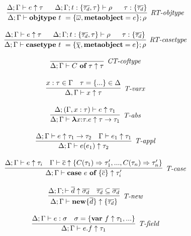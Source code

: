 \begin{figure}
\centering
\[
\begin{array}{c}

\infer[\textit{RT-objtype}]
	{\Delta; \Gamma \vdash  \keyw{objtype}~ t~=\{\overline{\omega}, \keyw{metaobject}=e\}; \rho} 
	{\Delta; \Gamma \vdash e \uparrow\tau ~~~~~ \Delta; \Gamma; t:\{\overline{\tau_d},\tau\} \vdash \rho ~~~~~ \tau: \{\overline{\tau_d}\}  }\\[3ex]

\infer[\textit{RT-casetype}]
	{\Delta; \Gamma \vdash  \keyw{casetype}~ t~=\{\overline{\chi}, \keyw{metaobject}=e\}; \rho} 
	{\Delta; \Gamma \vdash e \uparrow\tau ~~~~~ \Delta; \Gamma; t:\{\overline{\tau_d},\tau\} \vdash \rho ~~~~~ \tau: \{\overline{\tau_d}\}  }\\[3ex]

\infer[\textit{CT-coftype}]
	{\Delta; \Gamma \vdash  C~\keyw{of}~\tau \uparrow \tau} 
	{   }\\[3ex]

\infer[\textit{T-varx}]
	{\Delta,\Gamma \vdash x\uparrow\tau } 
	{x:\tau \in \Gamma & \tau= \{...\} \in \Delta}\\[3ex]

\infer[\textit{T-abs}]
	{\Delta; \Gamma \vdash  \boldsymbol\lambda x{:}\tau . e \uparrow \tau \rightarrow \tau_1} 
	{\Delta; (\Gamma, x:\tau) \vdash e\uparrow\tau_1 }\\[3ex]

\infer[\textit{T-appl}]
	{\Delta; \Gamma \vdash  e(e_1) \uparrow\tau_2} 
	{\Delta; \Gamma \vdash e \uparrow \tau_1 \rightarrow \tau_2 & \Gamma \vdash e_1 \uparrow \tau_1}\\[3ex]

\infer[\textit{T-case}]
	{\Delta; \Gamma \vdash  \keyw{case}~e~\keyw{of}~\{ \overline{c} \} \uparrow\tau'_i} 
	{\Delta; \Gamma \vdash e \uparrow \tau_i & \Gamma \vdash \overline{c} \uparrow \{C(\tau_1)\Rightarrow \tau'_1,...,C(\tau_n)\Rightarrow \tau'_n\}}\\[3ex]

\infer[\textit{T-new}]
	{\Delta; \Gamma \vdash \keyw{new} \{ \overline{d} \} \uparrow \{ \overline{\tau_d} \}}
	{\Delta; \Gamma; \vdash \overline{d} \uparrow \overline{\sigma_d} & \overline{\tau_d} \subseteq \overline{\sigma_d}} \\[3ex]

\infer[\textit{T-field}]
	{\Delta; \Gamma \vdash  e.f \uparrow \tau_1} 
	{\Delta; \Gamma \vdash e:\sigma & \sigma= \{\keyw{var}~ f \uparrow \tau_1,... \} }\\[3ex]


\end{array}\]
\end{figure}
